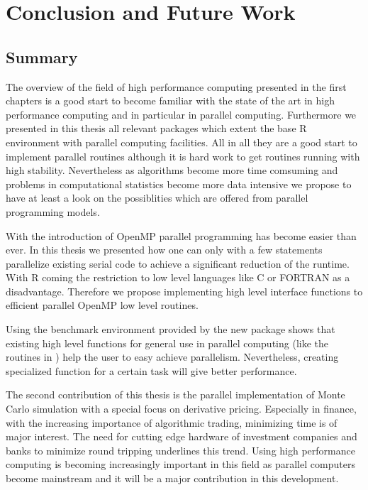 \chapter{Conclusion and Future Work}
\label{chap:conclusion}
\section{Summary}

The overview of the field of high performance computing presented in
the first chapters is a good start to become familiar with the state
of the art in high performance computing and in particular in parallel
computing. Furthermore we presented in this thesis all relevant
packages which extent the base R environment with parallel computing
facilities. All in all they are a good start to implement parallel
routines although it is hard work to get routines running with high
stability. Nevertheless as algorithms become more time comsuming and
problems in computational statistics become more data intensive we
propose to have at least a look on the possiblities which are offered
from parallel programming models.

With the introduction of OpenMP parallel programming has become easier
than ever. In this thesis we presented how one can only with a few
statements parallelize existing serial code to achieve a significant
reduction of the runtime. With R coming the restriction to low level
languages like C or FORTRAN as a disadvantage. Therefore we propose
implementing high level interface functions to efficient parallel
OpenMP low level routines.

Using the benchmark environment provided by the new package 
shows that existing high level  functions for general use in parallel
computing (like the routines in )
help the user to easy achieve parallelism. Nevertheless, creating
specialized function for a certain task will give better performance.

The second contribution of this thesis is the parallel implementation
of Monte Carlo simulation with a special focus on derivative
pricing. Especially in finance, with the increasing importance of
algorithmic trading, minimizing time is of major interest. The need for
cutting edge hardware of investment companies and banks to minimize
round tripping underlines this trend. Using high performance computing
is becoming increasingly important in this field as parallel computers
become mainstream and it will be a major contribution in this
development.


